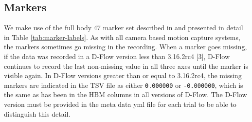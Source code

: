\documentclass[fleqn,12pt]{wlpeerj}
\begin{document}
\subsection*{Markers}
%
We make use of the full body 47 marker set described in \cite{Bogert2013} and
presented in detail in Table \ref{tab:marker-labels}. As with all camera based
motion capture systems, the markers sometimes go missing in the recording. When
a marker goes missing, if the data was recorded in a D-Flow version less than
3.16.2rc4 [3], D-Flow continues to record the last non-missing value in all
three axes until the marker is visible again. In D-Flow versions greater than
or equal to 3.16.2rc4, the missing markers are indicated in the TSV file as
either \verb|0.000000| or \verb|-0.000000|, which is the same as has been in
the HBM columns in all versions of D-Flow. The D-Flow version must be provided
in the meta data yml file for each trial to be able to distinguish this detail.
%
\end{document}
